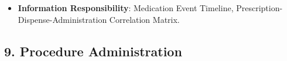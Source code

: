 \begin{itemize}
\begin{itemize}
\begin{itemize}
\item 
\emph{Exposed Service}: \texttt{} — Ingests pharmacy supply notifications.



\end{itemize}


\item 
\textbf{Feature: Medication Administration Record (MAR) Ingestion}:


\begin{itemize}

\item 
\emph{Function}: \texttt{} — Records medication administration-event information, including nurse-administered doses, e-MAR documentation and infusion telemetry as non-exhaustive examples; scope is not limited to nursing, bedside or inpatient settings.



\item 
\emph{Exposed Service}: \texttt{} — Ingests administration records.



\end{itemize}


\end{itemize}


\item 
\textbf{Information Responsibility}: Medication Event Timeline, Prescription-Dispense-Administration Correlation Matrix.



\end{itemize}
\label{rad:sa:146}

\par\smallskip
{}\label{rad:sa:148}
\subsection*{9. Procedure Administration}
\label{rad:sa:149}

